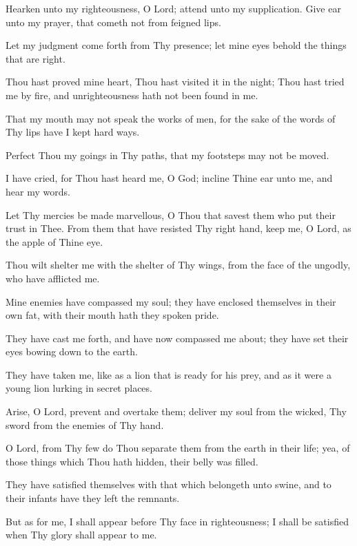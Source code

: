 Hearken unto my righteousness, O Lord; attend unto my supplication. Give ear unto my prayer, that cometh not from feigned lips.

Let my judgment come forth from Thy presence; let mine eyes behold the things that are right.

Thou hast proved mine heart, Thou hast visited it in the night; Thou hast tried me by fire, and unrighteousness hath not been found in me.

That my mouth may not speak the works of men, for the sake of the words of Thy lips have I kept hard ways.

Perfect Thou my goings in Thy paths, that my footsteps may not be moved.

I have cried, for Thou hast heard me, O God; incline Thine ear unto me, and hear my words.

Let Thy mercies be made marvellous, O Thou that savest them who put their trust in Thee. From them that have resisted Thy right hand, keep me, O Lord, as the apple of Thine eye.

Thou wilt shelter me with the shelter of Thy wings, from the face of the ungodly, who have afflicted me.

Mine enemies have compassed my soul; they have enclosed themselves in their own fat, with their mouth hath they spoken pride.

They have cast me forth, and have now compassed me about; they have set their eyes bowing down to the earth.

They have taken me, like as a lion that is ready for his prey, and as it were a young lion lurking in secret places.

Arise, O Lord, prevent and overtake them; deliver my soul from the wicked, Thy sword from the enemies of Thy hand.

O Lord, from Thy few do Thou separate them from the earth in their life; yea, of those things which Thou hath hidden, their belly was filled.

They have satisfied themselves with that which belongeth unto swine, and to their infants have they left the remnants.

But as for me, I shall appear before Thy face in righteousness; I shall be satisfied when Thy glory shall appear to me.
